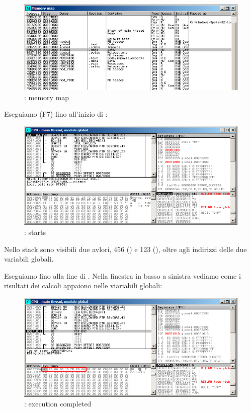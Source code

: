 \begin{figure}[H]
\centering
\includegraphics[scale=\FigScale]{patterns/061_pointers/olly_global5.png}
\caption{\olly: memory map}
\label{fig:pointers_olly_global_5}
\end{figure}

\clearpage
Eseguiamo (F7) fino all'inizio di \ttfone: 

\begin{figure}[H]
\centering
\includegraphics[scale=\FigScale]{patterns/061_pointers/olly_global2.png}
\caption{\olly: \ttfone starts}
\label{fig:pointers_olly_global_2}
\end{figure}

Nello stack sono visibili due avlori, 456 () e
123 (), oltre agli indirizzi delle due variabili globali.

\clearpage

Eseguiamo fino alla fine di \ttfone.
Nella finestra in basso a sinistra vediamo come i risultati dei calcoli appaiono nelle viariabili globali:

\begin{figure}[H]
\centering
\includegraphics[scale=\FigScale]{patterns/061_pointers/olly_global3.png}
\caption{\olly: \ttfone execution completed}
\label{fig:pointers_olly_global_3}
\end{figure}


